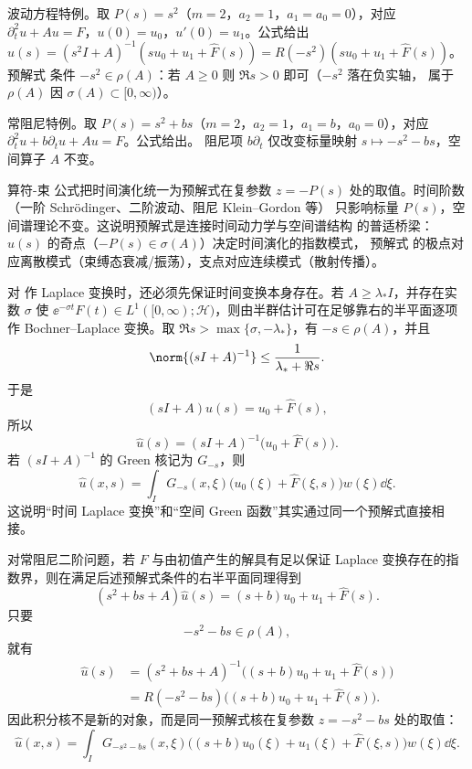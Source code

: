 波动方程特例。取 $P(s)=s^2$（$m=2$，$a_2=1$，$a_1=a_0=0$），对应
$\partial_t^2u+Au=F$，$u(0)=u_0$，$u'(0)=u_1$。公式给出
$\widehat u(s)=(s^2I+A)^{-1}(su_0+u_1+\widehat F(s))=R(-s^2)(su_0+u_1+\widehat F(s))$。
预解式 条件 $-s^2\in\rho(A)$：若 $A\ge0$ 则 $\Re s>0$ 即可（$-s^2$ 落在负实轴，
属于 $\rho(A)$ 因 $\sigma(A)\subset[0,\infty)$）。

常阻尼特例。取 $P(s)=s^2+bs$（$m=2$，$a_2=1$，$a_1=b$，$a_0=0$），对应
$\partial_t^2u+b\partial_tu+Au=F$。公式给出。
阻尼项 $b\partial_t$ 仅改变标量映射 $s\mapsto-s^2-bs$，空间算子 $A$ 不变。

算符-束 公式把时间演化统一为预解式在复参数
$z=-P(s)$ 处的取值。时间阶数（一阶 Schrödinger、二阶波动、阻尼 Klein--Gordon 等）
只影响标量 $P(s)$，空间谱理论不变。这说明预解式是连接时间动力学与空间谱结构
的普适桥梁：$\widehat u(s)$ 的奇点（$-P(s)\in\sigma(A)$）决定时间演化的指数模式，
预解式 的极点对应离散模式（束缚态衰减/振荡），支点对应连续模式（散射传播）。

对 作 Laplace 变换时，还必须先保证时间变换本身存在。若 $A\ge \lambda_*I$，并存在实数 $\sigma$ 使
$\ee^{-\sigma t}F(t)\in L^1([0,\infty);\mathcal H)$，则由半群估计可在足够靠右的半平面逐项作 Bochner--Laplace 变换。取 $\Re s>\max\{\sigma,-\lambda_*\}$，有 $-s\in\rho(A)$，并且
\[
 \norm{(sI+A)^{-1}}\le\frac{1}{\lambda_*+\Re s}.
\]
于是
\begin{equation*}(sI+A)\widehat u(s)=u_0+\widehat F(s),
\end{equation*}
所以
\begin{equation}\label{eq:math-sl-laplace-first-resolvent}
 \widehat u(s)=(sI+A)^{-1}\bigl(u_0+\widehat F(s)\bigr).
\end{equation}
若 $(sI+A)^{-1}$ 的 Green 核记为 $G_{-s}$，则
\begin{equation*}\widehat u(x,s)=\int_I
 G_{-s}(x,\xi)\bigl(u_0(\xi)+\widehat F(\xi,s)\bigr)w(\xi)\dd\xi.
\end{equation*}
这说明“时间 Laplace 变换”和“空间 Green 函数”其实通过同一个预解式直接相接。

对常阻尼二阶问题，若 $F$ 与由初值产生的解具有足以保证 Laplace 变换存在的指数界，则在满足后述预解式条件的右半平面同理得到
\begin{equation*}(s^2+bs+A)\widehat u(s)=(s+b)u_0+u_1+\widehat F(s).
\end{equation*}
只要
\[
 -s^2-bs\in\rho(A),
\]
就有
\begin{equation}\label{eq:math-sl-laplace-second-resolvent}
\begin{aligned}
 \widehat u(s)
 &=(s^2+bs+A)^{-1}\bigl((s+b)u_0+u_1+\widehat F(s)\bigr)\\
 &=R(-s^2-bs)\bigl((s+b)u_0+u_1+\widehat F(s)\bigr).
\end{aligned}
\end{equation}
因此积分核不是新的对象，而是同一预解式核在复参数 $z=-s^2-bs$ 处的取值：
\begin{equation*}\widehat u(x,s)=\int_I G_{-s^2-bs}(x,\xi)
 \bigl((s+b)u_0(\xi)+u_1(\xi)+\widehat F(\xi,s)\bigr)w(\xi)\dd\xi.
\end{equation*}

